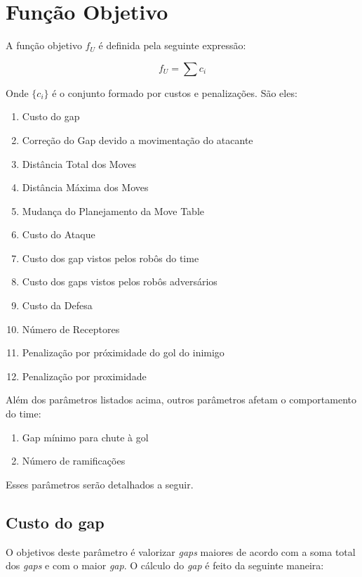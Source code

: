 \section{Função Objetivo}

A função objetivo $f_U$ é definida pela seguinte
expressão:

\begin{dmath}
  f_U = \sum c_i 
\end{dmath}

Onde $\lbrace c_i \rbrace$ é o conjunto formado
por custos e penalizações. São eles:
\begin{enumerate}
  \item Custo do gap
  \item Correção do Gap devido a movimentação do atacante
  \item Distância Total dos Moves
  \item Distância Máxima dos Moves 
  \item Mudança do Planejamento da Move Table
  \item Custo do Ataque
  \item Custo dos gap vistos pelos robôs do time
  \item Custo dos gaps vistos pelos robôs adversários
  \item Custo da Defesa
  \item Número de Receptores
  \item Penalização por próximidade do gol do inimigo
  \item Penalização por proximidade
\end{enumerate}

Além dos parâmetros listados acima, outros parâmetros
afetam o comportamento do time:
\begin{enumerate}
  \item Gap mínimo para chute à gol
  \item Número de ramificações
\end{enumerate}

Esses parâmetros serão detalhados a seguir.

\subsection{Custo do gap} 

O objetivos deste parâmetro é valorizar \textit{gaps} maiores
de acordo com a soma total dos \textit{gaps} e com o maior \textit{gap}.
O cálculo do \textit{gap} é feito da seguinte maneira:

